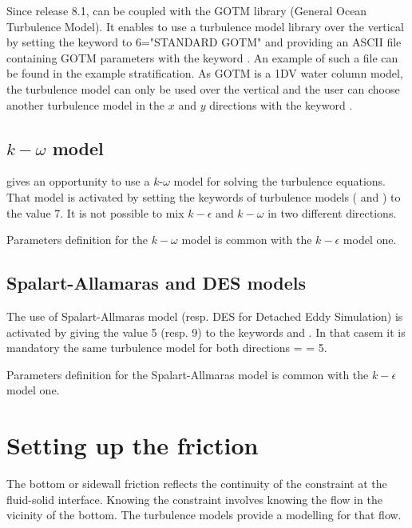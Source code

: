 Since release 8.1,  can be coupled with the GOTM library
(General Ocean Turbulence Model).
It enables to use a turbulence model library over the vertical by setting
the keyword  to 6="STANDARD GOTM"
and providing an ASCII file containing GOTM parameters with the keyword
.
An example of such a file can be found in the  example
stratification.
As GOTM is a 1DV water column model, the turbulence model can only be used over
the vertical and the user can choose another turbulence model in the $x$ and
$y$ directions with the keyword .

\subsection{$k-\omega$ model}

 gives an opportunity to use a $k$-$\omega$ model for solving
the turbulence equations.
That model is activated by setting the keywords of turbulence models
( and )
to the value 7.
It is not possible to mix $k-\epsilon$ and $k-\omega$ in two different
directions.

Parameters definition for the $k-\omega$ model is common
with the $k-\epsilon$ model one.

\subsection{Spalart-Allamaras and DES models}

The use of Spalart-Allmaras  model (resp. DES for Detached Eddy Simulation)
is activated by giving the value 5 (resp. 9) to the keywords
 and .
In that casem it is mandatory the same turbulence model for both directions
 =  = 5.

Parameters definition for the Spalart-Allmaras model is common
with the $k-\epsilon$ model one.


\section{Setting up the friction}

The bottom or sidewall friction reflects the continuity of the constraint at
the fluid-solid interface. Knowing the constraint involves knowing the flow in
the vicinity of the bottom. The turbulence models provide a modelling for that
flow.

